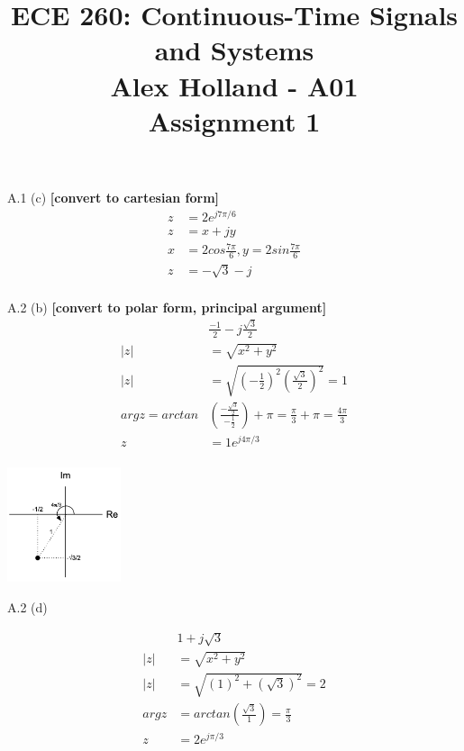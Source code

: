\documentclass{article}
\title{%
   ECE 260: Continuous-Time Signals and Systems\\
    \Large Alex Holland - A01\\
    Assignment 1\\
    }
\date{}
\begin{document}
\maketitle


A.1 (c) {\bf [convert to cartesian form]}\\

\begin{equation*}
\begin{split}
     z &= 2e^{j7\pi/6}\\
     z &= x+jy\\
     x &= 2cos\frac{7\pi}{6}, y = 2sin\frac{7\pi}{6}\\
     z &= -\sqrt{3}-j\\
    \end{split}
\end{equation*} 
 
A.2 (b) {\bf [convert to polar form, principal argument]}\\
  
\begin{equation*}
\begin{split}
    & \frac{-1}{2} - j \frac{\sqrt{3}}{2}\\
    |z| &= \sqrt{x^2+y^2}\\
    |z| &= \sqrt{(-\frac{1}{2})^2(\frac{\sqrt{3}}{2})^2} = 1\\
    argz = arctan&(\frac{-\frac{\sqrt{3}}{2}}{-\frac{1}{2}}) + \pi = \frac{\pi}{3} + \pi = \frac{4\pi}{3}\\
    z &= 1e^{j4\pi/3}\\
\end{split}
\end{equation*} 

\begin{center}
    \includegraphics[width=0.25\textwidth]{a2b.png}
\end{center}

A.2 (d)

\begin{equation*}
\begin{split}
    & 1 + j\sqrt{3}\\
    |z| &= \sqrt{x^2+y^2}\\
    |z| &= \sqrt{(1)^2+(\sqrt{3})^2} = 2\\
    argz &= arctan(\frac{\sqrt{3}}{1}) = \frac{\pi}{3}\\
    z &= 2e^{j\pi/3}
\end{split}
\end{equation*} 
\end{document}
